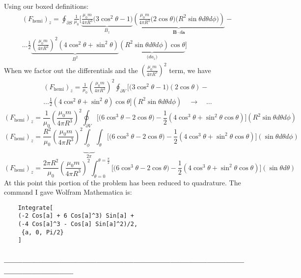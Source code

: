 \documentclass[a4paper,12pt]{article} %
\begin{document}
Using our boxed definitions:
$$
\begin{align}
	(F_{\text{hemi}})_z=\oint_{\partial S}\frac{1}{\mu_0}\Bigg[\underbrace{\frac{\mu_0m}{4\pi R^3}\big(3\cos^2\theta -1\big)}_{B_z}\underbrace{\left(\frac{\mu_0m}{4\pi R^3}
\big(2\cos\theta\big)\big(R^2\sin\theta d\theta d\phi\big)\right)}_{\mathbf{B}\cdot d\mathbf{a}}- \\\ldots \frac12 \underbrace{\left(\frac{\mu_0m}{4\pi R^3}\right)^2\left(4\cos^2\theta + \sin^2\theta\right)}_{B^2} \underbrace{(R^2\sin\theta d\theta d\phi)\cos\theta}_{\big(d a_z\big)}
\Bigg]
\end{align}
$$
When we factor out the differentials and the $\left(\frac{\mu_0m}{4\pi R^3}\right)^2$ term, we have
$$
\begin{align}
	(F_{\text{hemi}})_z=\frac{1}{\mu_0}\left(\frac{\mu_0m}{4\pi R^3}\right)^2\oint_{\partial V}\Bigg[\big(3\cos^2\theta -1\big)\left(2\cos\theta\right)- \\\ldots \frac12 \left(4\cos^2\theta + \sin^2\theta\right)\cos\theta
\Bigg](R^2\sin\theta d\theta d\phi) \quad\rightarrow\quad\ldots
\end{align}
$$
$$ 
(F_{\text{hemi}})_z=\frac{1}{\mu_0}\left(\frac{\mu_0m}{4\pi R^3}\right)^2\oint_{\partial V}\Bigg[\big(6\cos^3\theta -2\cos\theta\big)- \frac12 \left(4\cos^3\theta + \sin^2\theta\cos{\theta}\right)\Bigg](R^2\sin\theta d\theta d\phi)
$$
$$ 
(F_{\text{hemi}})_z=\frac{R^2}{\mu_0}\left(\frac{\mu_0m}{4\pi R^3}\right)^2\underbrace{\int_{\phi}}_{2\pi}\int_{\theta}\Bigg[\big(6\cos^3\theta -2\cos\theta\big)- \frac12 \left(4\cos^3\theta + \sin^2\theta\cos{\theta}\right)\Bigg](\sin\theta d\theta d\phi)
$$
$$ 
(F_{\text{hemi}})_z=\frac{2\pi R^2}{\mu_0}\left(\frac{\mu_0m}{4\pi R^3}\right)^2\int_{\theta=0}^{\theta=\frac{\pi}{2}}\Bigg[\big(6\cos^3\theta -2\cos\theta\big)- \frac12 \left(4\cos^3\theta + \sin^2\theta\cos{\theta}\right)\Bigg](\sin\theta d\theta)
$$
At this point this portion of the problem has been reduced to quadrature. The command I gave Wolfram Mathematica is:
\begin{verbatim}
	Integrate[
	(-2 Cos[a] + 6 Cos[a]^3) Sin[a] + 
	(-4 Cos[a]^3 - Cos[a] Sin[a]^2)/2,
	 {a, 0, Pi/2}
	]
\end{verbatim}
\subsubsection*{-----------------------------------------------------------------------------------------------------}
\end{document}
